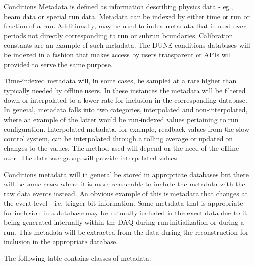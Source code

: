 \documentclass[../main-v1.tex]{subfiles}
\begin{document}
Conditions Metadata is defined as information describing physics data - eg., beam data or special run data. Metadata can be indexed by either time or run or fraction of a run. Additionally,  may be used to index metadata that is used over periods not directly corresponding to run or subrun boundaries. Calibration constants are an example of such metadata. The DUNE conditions databases will be indexed in a fashion that makes access by users transparent or APIs will provided to serve the same purpose.

Time-indexed metadata will, in some cases, be sampled at a rate higher than typically needed by offline users. In these instances the metadata will be filtered down or interpolated to a lower rate for inclusion in the corresponding database. In general, metadata falls into two categories, interpolated and non-interpolated, where an example of the latter would be run-indexed values pertaining to run configuration. Interpolated metadata, for example, readback values from the slow control system, can be interpolated through a rolling average or updated on changes to the values. The method used will depend on the need of the offline user. The database group will provide interpolated values.  

Conditions metadata will in general be stored in appropriate databases but there will be some cases where it is more reasonable to include the metadata with the raw data events instead. An obvious example of this is metadata that changes at the event level - i.e. trigger bit information. Some metadata that is appropriate for inclusion in a database may be naturally included in the event data due to it being generated internally within the DAQ during run initialization or during a run. This metadata will be extracted from the data during the reconstruction for inclusion in the appropriate database. 

The following table contains classes of metadata: 
\end{document}
